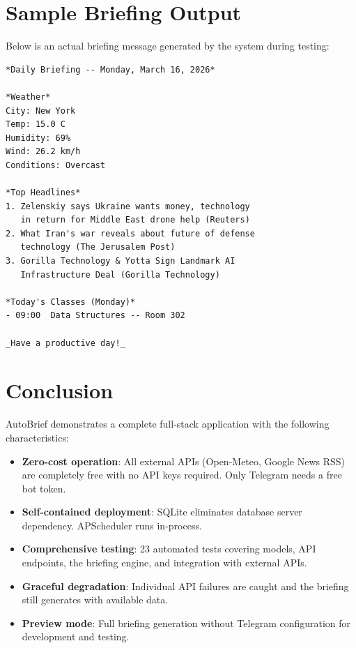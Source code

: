 \documentclass[12pt, a4paper]{article}
\begin{document}
\section{Sample Briefing Output}

Below is an actual briefing message generated by the system during testing:

\begin{lstlisting}[language={}, title={Sample briefing (March 16, 2026)}]
*Daily Briefing -- Monday, March 16, 2026*

*Weather*
City: New York
Temp: 15.0 C
Humidity: 69%
Wind: 26.2 km/h
Conditions: Overcast

*Top Headlines*
1. Zelenskiy says Ukraine wants money, technology
   in return for Middle East drone help (Reuters)
2. What Iran's war reveals about future of defense
   technology (The Jerusalem Post)
3. Gorilla Technology & Yotta Sign Landmark AI
   Infrastructure Deal (Gorilla Technology)

*Today's Classes (Monday)*
- 09:00  Data Structures -- Room 302

_Have a productive day!_
\end{lstlisting}

\section{Conclusion}

AutoBrief demonstrates a complete full-stack application with the following characteristics:

\begin{itemize}[leftmargin=2em]
  \item \textbf{Zero-cost operation}: All external APIs (Open-Meteo, Google News RSS) are completely free with no API keys required. Only Telegram needs a free bot token.
  \item \textbf{Self-contained deployment}: SQLite eliminates database server dependency. APScheduler runs in-process.
  \item \textbf{Comprehensive testing}: 23 automated tests covering models, API endpoints, the briefing engine, and integration with external APIs.
  \item \textbf{Graceful degradation}: Individual API failures are caught and the briefing still generates with available data.
  \item \textbf{Preview mode}: Full briefing generation without Telegram configuration for development and testing.
\end{itemize}
\end{document}
